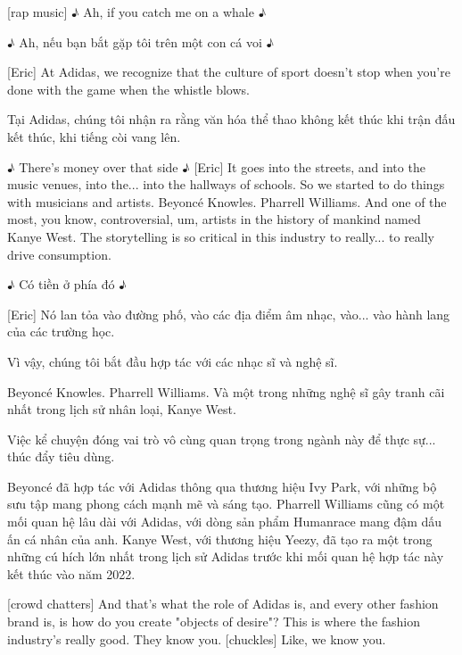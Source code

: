 \documentclass[a4paper]{article}
\begin{document}
	[rap music]
	♪ Ah, if you catch me on a whale ♪
	
	\begin{vietnamese-v2}
		
		♪ Ah, nếu bạn bắt gặp tôi trên một con cá voi ♪
	\end{vietnamese-v2}
	
	
	[Eric] At Adidas, we recognize that the culture of sport doesn't stop when you're done with the game when the whistle blows.
	
	\begin{vietnamese-v2}
		[Eric] Tại Adidas, chúng tôi nhận ra rằng văn hóa thể thao không kết thúc khi trận đấu kết thúc, khi tiếng còi vang lên.
	\end{vietnamese-v2}
	
	♪ There's money over that side ♪
	[Eric] It goes into the streets, and into the music venues, into the... into the hallways of schools.
	So we started to do things with musicians and artists.
	Beyoncé Knowles.
	Pharrell Williams.
	And one of the most, you know, controversial, um, artists in the history of mankind named Kanye West.
	The storytelling is so critical in this industry to really... to really drive consumption.
	
	\begin{vietnamese-v2}
		♪ Có tiền ở phía đó ♪
		
		[Eric] Nó lan tỏa vào đường phố, vào các địa điểm âm nhạc, vào... vào hành lang của các trường học.
		
		Vì vậy, chúng tôi bắt đầu hợp tác với các nhạc sĩ và nghệ sĩ.
		
		Beyoncé Knowles. Pharrell Williams. Và một trong những nghệ sĩ gây tranh cãi nhất trong lịch sử nhân loại, Kanye West.
		
		Việc kể chuyện đóng vai trò vô cùng quan trọng trong ngành này để thực sự... thúc đẩy tiêu dùng.
		
		Beyoncé đã hợp tác với Adidas thông qua thương hiệu Ivy Park, với những bộ sưu tập mang phong cách mạnh mẽ và sáng tạo. Pharrell Williams cũng có một mối quan hệ lâu dài với Adidas, với dòng sản phẩm Humanrace mang đậm dấu ấn cá nhân của anh. Kanye West, với thương hiệu Yeezy, đã tạo ra một trong những cú hích lớn nhất trong lịch sử Adidas trước khi mối quan hệ hợp tác này kết thúc vào năm 2022.
	\end{vietnamese-v2}
	
	[crowd chatters]
	And that's what the role of Adidas is, and every other fashion brand is, is how do you create "objects of desire"?
	This is where the fashion industry's really good. They know you.
	[chuckles] Like, we know you.
	
\end{document}
